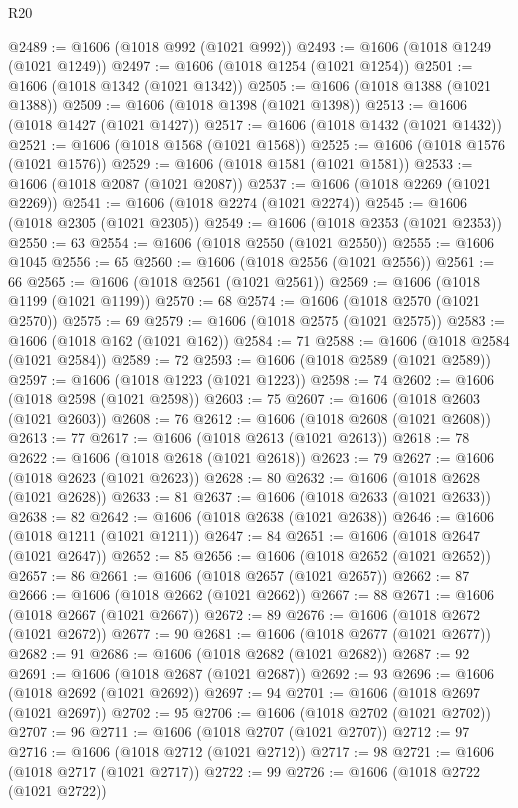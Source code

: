 \begin{lexlean}{R20}
\begin{coremodule}
@2489 := @1606 (@1018 @992 (@1021 @992))
@2493 := @1606 (@1018 @1249 (@1021 @1249))
@2497 := @1606 (@1018 @1254 (@1021 @1254))
@2501 := @1606 (@1018 @1342 (@1021 @1342))
@2505 := @1606 (@1018 @1388 (@1021 @1388))
@2509 := @1606 (@1018 @1398 (@1021 @1398))
@2513 := @1606 (@1018 @1427 (@1021 @1427))
@2517 := @1606 (@1018 @1432 (@1021 @1432))
@2521 := @1606 (@1018 @1568 (@1021 @1568))
@2525 := @1606 (@1018 @1576 (@1021 @1576))
@2529 := @1606 (@1018 @1581 (@1021 @1581))
@2533 := @1606 (@1018 @2087 (@1021 @2087))
@2537 := @1606 (@1018 @2269 (@1021 @2269))
@2541 := @1606 (@1018 @2274 (@1021 @2274))
@2545 := @1606 (@1018 @2305 (@1021 @2305))
@2549 := @1606 (@1018 @2353 (@1021 @2353))
@2550 := 63
@2554 := @1606 (@1018 @2550 (@1021 @2550))
@2555 := @1606 @1045
@2556 := 65
@2560 := @1606 (@1018 @2556 (@1021 @2556))
@2561 := 66
@2565 := @1606 (@1018 @2561 (@1021 @2561))
@2569 := @1606 (@1018 @1199 (@1021 @1199))
@2570 := 68
@2574 := @1606 (@1018 @2570 (@1021 @2570))
@2575 := 69
@2579 := @1606 (@1018 @2575 (@1021 @2575))
@2583 := @1606 (@1018 @162 (@1021 @162))
@2584 := 71
@2588 := @1606 (@1018 @2584 (@1021 @2584))
@2589 := 72
@2593 := @1606 (@1018 @2589 (@1021 @2589))
@2597 := @1606 (@1018 @1223 (@1021 @1223))
@2598 := 74
@2602 := @1606 (@1018 @2598 (@1021 @2598))
@2603 := 75
@2607 := @1606 (@1018 @2603 (@1021 @2603))
@2608 := 76
@2612 := @1606 (@1018 @2608 (@1021 @2608))
@2613 := 77
@2617 := @1606 (@1018 @2613 (@1021 @2613))
@2618 := 78
@2622 := @1606 (@1018 @2618 (@1021 @2618))
@2623 := 79
@2627 := @1606 (@1018 @2623 (@1021 @2623))
@2628 := 80
@2632 := @1606 (@1018 @2628 (@1021 @2628))
@2633 := 81
@2637 := @1606 (@1018 @2633 (@1021 @2633))
@2638 := 82
@2642 := @1606 (@1018 @2638 (@1021 @2638))
@2646 := @1606 (@1018 @1211 (@1021 @1211))
@2647 := 84
@2651 := @1606 (@1018 @2647 (@1021 @2647))
@2652 := 85
@2656 := @1606 (@1018 @2652 (@1021 @2652))
@2657 := 86
@2661 := @1606 (@1018 @2657 (@1021 @2657))
@2662 := 87
@2666 := @1606 (@1018 @2662 (@1021 @2662))
@2667 := 88
@2671 := @1606 (@1018 @2667 (@1021 @2667))
@2672 := 89
@2676 := @1606 (@1018 @2672 (@1021 @2672))
@2677 := 90
@2681 := @1606 (@1018 @2677 (@1021 @2677))
@2682 := 91
@2686 := @1606 (@1018 @2682 (@1021 @2682))
@2687 := 92
@2691 := @1606 (@1018 @2687 (@1021 @2687))
@2692 := 93
@2696 := @1606 (@1018 @2692 (@1021 @2692))
@2697 := 94
@2701 := @1606 (@1018 @2697 (@1021 @2697))
@2702 := 95
@2706 := @1606 (@1018 @2702 (@1021 @2702))
@2707 := 96
@2711 := @1606 (@1018 @2707 (@1021 @2707))
@2712 := 97
@2716 := @1606 (@1018 @2712 (@1021 @2712))
@2717 := 98
@2721 := @1606 (@1018 @2717 (@1021 @2717))
@2722 := 99
@2726 := @1606 (@1018 @2722 (@1021 @2722))

\end{coremodule}
\end{lexlean}

